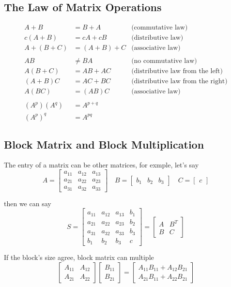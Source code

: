 \documentclass{article}
\begin{document}
    \subsection{The Law of Matrix Operations}

    $$\begin{aligned}
        A+B&=B+A&\text{(commutative law)}\\
        c(A+B)&=cA+cB&\text{(distributive law)}\\
        A+(B+C)&=(A+B)+C&\text{(associative law)}\\
        \\
        AB&\not =BA&\text{(no commutative law)}\\
        A(B+C)&=AB+AC&\text{(distributive law from the left)}\\
        (A+B)C&=AC+BC&\text{(distributive law from the right)}\\
        A(BC)&=(AB)C&\text{(associative law)}\\
        \\
        (A^p)(A^q)&=A^{p+q}\\
        (A^p)^q&=A^{pq}
    \end{aligned}$$

    \subsection{Block Matrix and Block Multiplication}

    The entry of a matrix can be other matrices, for exmple, let's say
    $$A=\begin{bmatrix}a_{11}&a_{12}&a_{13}\\a_{21}&a_{22}&a_{23}\\a_{31}&a_{32}&a_{33}\end{bmatrix}\quad
        B=\begin{bmatrix}b_1&b_2&b_3\end{bmatrix}\quad
            C=\begin{bmatrix}c\end{bmatrix}$$

    then we can say
    $$S=\begin{bmatrix}a_{11}&a_{12}&a_{13}&b_{1}\\a_{21}&a_{22}&a_{23}&b_{2}\\a_{31}&a_{32}&a_{33}&b_{3}\\b_1&b_2&b_3&c\end{bmatrix}
        =\begin{bmatrix}A&B^T\\B&C\end{bmatrix}$$

    If the block's size agree, block matrix can multiple
    $$\begin{bmatrix}A_{11}&A_{12}\\A_{21}&A_{22}\end{bmatrix}
    \begin{bmatrix}B_{11}\\B_{21}\end{bmatrix}
    =\begin{bmatrix}A_{11}B_{11}+A_{12}B_{21}\\A_{21}B_{11}+A_{22}B_{21}\end{bmatrix}$$
    
\end{document}
